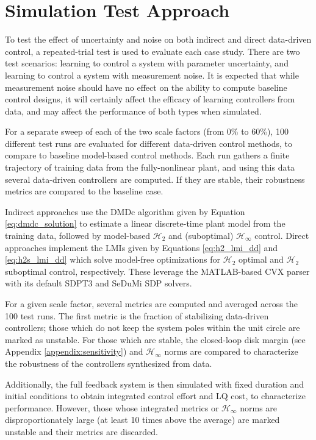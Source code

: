 \section{Simulation Test Approach}
\label{sect:results:testapproach}
To test the effect of uncertainty and noise on both indirect and direct data-driven control, a repeated-trial test is used to evaluate each case study.  There are two test scenarios: learning to control a system with parameter uncertainty, and learning to control a system with measurement noise.  It is expected that while measurement noise should have no effect on the ability to compute baseline control designs, it will certainly affect the efficacy of learning controllers from data, and may affect the performance of both types when simulated.

For a separate sweep of each of the two scale factors (from 0\% to 60\%), 100 different test runs are evaluated for different data-driven control methods, to compare to baseline model-based control methods.  Each run gathers a finite trajectory of training data from the fully-nonlinear plant, and using this data several data-driven controllers are computed.  If they are stable, their robustness metrics are compared to the baseline case.

Indirect approaches use the DMDc algorithm given by Equation \eqref{eq:dmdc_solution} to estimate a linear discrete-time plant model from the training data, followed by model-based $\mathcal{H}_{2}$ and (suboptimal) $\mathcal{H}_{\infty}$ control.  Direct approaches implement the LMIs given by Equations \eqref{eq:h2_lmi_dd} and \eqref{eq:h2s_lmi_dd} which solve model-free optimizations for $\mathcal{H}_{2}$ optimal and $\mathcal{H}_{2}$ suboptimal control, respectively.  These leverage the MATLAB-based CVX parser \cite{grant2008graph, grant2008cvx} with its default SDPT3 \cite{toh1999sdpt3, tutuncu2001sdpt3} and SeDuMi \cite{sturm1999using} SDP solvers.

For a given scale factor, several metrics are computed and averaged across the 100 test runs.  The first metric is the fraction of stabilizing data-driven controllers; those which do not keep the system poles within the unit circle are marked as unstable.  For those which are stable, the closed-loop disk margin (see Appendix \ref{appendix:sensitivity}) and $\mathcal{H}_{\infty}$ norms are compared to characterize the robustness of the controllers synthesized from data.

Additionally, the full feedback system is then simulated with fixed duration and initial conditions to obtain integrated control effort and LQ cost, to characterize performance.  However, those whose integrated metrics or $\mathcal{H}_{\infty}$ norms are disproportionately large (at least 10 times above the average) are marked unstable and their metrics are discarded.

